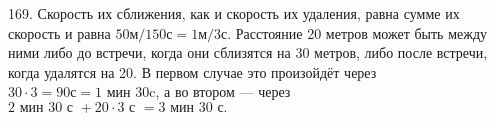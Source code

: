 169. Скорость их сближения, как и скорость их удаления, равна сумме их скорость и равна $50\text{м}/150\text{с}=1\text{м}/3\text{с}.$ Расстояние 20 метров может быть между ними либо до встречи, когда они сблизятся на 30 метров, либо после встречи, когда удалятся на 20. В первом случае это произойдёт через $30\cdot3=90\text{с}=1\text{ мин }30$c, а во втором --- через $2\text{ мин }30\text{ с }+20\cdot3\text{ с }=3\text{ мин }30\text{ с.}$\\
